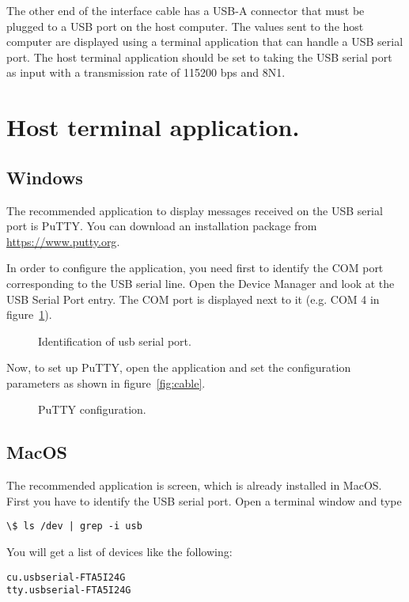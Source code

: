 The other end of the interface cable has a USB-A connector that must be plugged to a USB port on the host computer. The values sent to the host computer are displayed using a terminal application that can handle a USB serial port. The host terminal application should be set to taking the USB serial port as input with a transmission rate of 115200 bps and 8N1.

\section{Host terminal application.}\label{sc:term}
\subsection{Windows}

The recommended application to display messages received on the USB serial port is PuTTY. You can download an installation package from \url{https://www.putty.org}.

In order to configure the application, you need first to identify the COM port corresponding to the USB serial line. Open the Device Manager and look at the USB Serial Port entry. The COM port is displayed next to it (e.g. COM 4 in figure~\ref{fig:com}).

\begin{figure}[h]
            \caption{Identification of usb serial port.}
            \label{fig:com}
\end{figure}

Now, to set up PuTTY, open the application and set the configuration parameters as shown in figure~\ref{fig:cable}.

\begin{figure}[h]
            \caption{PuTTY configuration.}
            \label{fig:putty}
\end{figure}

\subsection{MacOS}
The recommended application is screen, which is already installed in MacOS.
First you have to identify the USB serial port. Open a terminal window and type
\begin{verbatim}
\$ ls /dev | grep -i usb
\end{verbatim}
You will get a list of devices like the following:
\begin{verbatim}
cu.usbserial-FTA5I24G
tty.usbserial-FTA5I24G
\end{verbatim}

